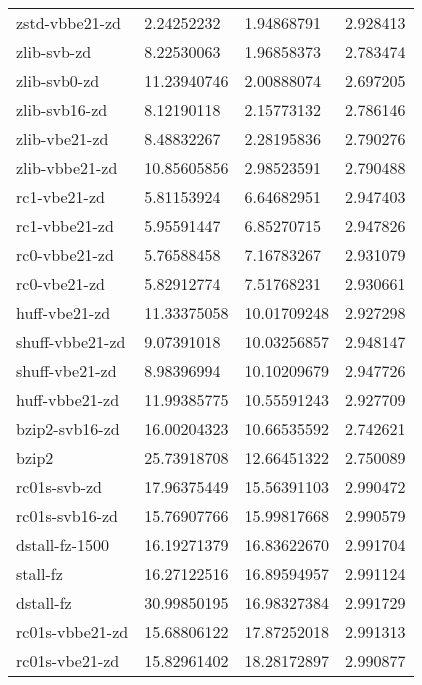\begin{table}
\begin{tabular}{|l|l|l|l|}
     zstd-vbbe21-zd     & 2.24252232      & 1.94868791    &2.928413\\
        zlib-svb-zd     & 8.22530063      & 1.96858373    &2.783474\\
       zlib-svb0-zd     &11.23940746      & 2.00888074    &2.697205\\
      zlib-svb16-zd     & 8.12190118      & 2.15773132    &2.786146\\
      zlib-vbe21-zd     & 8.48832267      & 2.28195836    &2.790276\\
     zlib-vbbe21-zd     &10.85605856      & 2.98523591    &2.790488\\
		\rowcolor{lightgray}
       rc1-vbe21-zd     & 5.81153924      & 6.64682951    &2.947403\\
		\rowcolor{lightgray}
      rc1-vbbe21-zd     & 5.95591447      & 6.85270715    &2.947826\\
		\rowcolor{lightgray}
      rc0-vbbe21-zd     & 5.76588458      & 7.16783267    &2.931079\\
		\rowcolor{lightgray}
       rc0-vbe21-zd     & 5.82912774      & 7.51768231    &2.930661\\
      huff-vbe21-zd     &11.33375058      &10.01709248    &2.927298\\
		\rowcolor{lightgray}
    shuff-vbbe21-zd     & 9.07391018      &10.03256857    &2.948147\\
		\rowcolor{lightgray}
     shuff-vbe21-zd     & 8.98396994      &10.10209679    &2.947726\\
     huff-vbbe21-zd     &11.99385775      &10.55591243    &2.927709\\
     bzip2-svb16-zd     &16.00204323      &10.66535592    &2.742621\\
              bzip2     &25.73918708      &12.66451322    &2.750089\\
		\rowcolor{lightgray}
       rc01s-svb-zd     &17.96375449      &15.56391103    &2.990472\\
		\rowcolor{lightgray}
     rc01s-svb16-zd     &15.76907766      &15.99817668    &2.990579\\
		\rowcolor{lightgray}
     dstall-fz-1500     &16.19271379      &16.83622670    &2.991704\\
		\rowcolor{lightgray}
           stall-fz     &16.27122516      &16.89594957    &2.991124\\
		\rowcolor{lightgray}
          dstall-fz     &30.99850195      &16.98327384    &2.991729\\
		\rowcolor{lightgray}
    rc01s-vbbe21-zd     &15.68806122      &17.87252018    &2.991313\\
		\rowcolor{lightgray}
     rc01s-vbe21-zd     &15.82961402      &18.28172897    &2.990877\\
	\hline
    \end{tabular}
\end{table}
